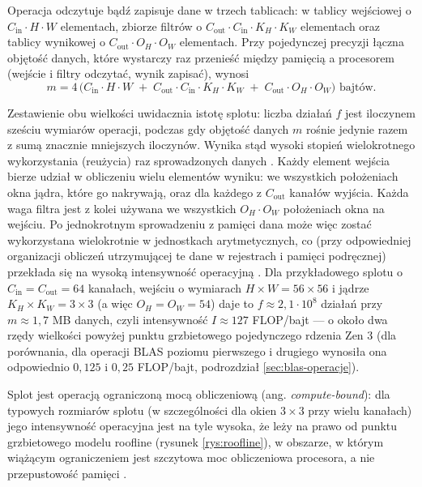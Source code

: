 \documentclass[a4paper,12pt]{book} %
\begin{document}
Operacja odczytuje bądź zapisuje dane w trzech tablicach: w tablicy wejściowej o $C_{\mathrm{in}} \cdot H \cdot W$ elementach, zbiorze filtrów o $C_{\mathrm{out}} \cdot C_{\mathrm{in}} \cdot K_H \cdot K_W$ elementach oraz tablicy wynikowej o $C_{\mathrm{out}} \cdot O_H \cdot O_W$ elementach. Przy pojedynczej precyzji łączna objętość danych, które wystarczy raz przenieść między pamięcią a procesorem (wejście i filtry odczytać, wynik zapisać), wynosi
\[
  m = 4\,\bigl( C_{\mathrm{in}} \cdot H \cdot W \;+\; C_{\mathrm{out}} \cdot C_{\mathrm{in}} \cdot K_H \cdot K_W \;+\; C_{\mathrm{out}} \cdot O_H \cdot O_W \bigr) \text{ bajtów}.
\]

Zestawienie obu wielkości uwidacznia istotę splotu: liczba działań $f$ jest iloczynem sześciu wymiarów operacji, podczas gdy objętość danych $m$ rośnie jedynie razem z sumą znacznie mniejszych iloczynów. Wynika stąd wysoki stopień wielokrotnego wykorzystania (reużycia) raz sprowadzonych danych \cite{goto2008anatomy}. Każdy element wejścia bierze udział w obliczeniu wielu elementów wyniku: we wszystkich położeniach okna jądra, które go nakrywają, oraz dla każdego z $C_{\mathrm{out}}$ kanałów wyjścia. Każda waga filtra jest z kolei używana we wszystkich $O_H \cdot O_W$ położeniach okna na wejściu. Po jednokrotnym sprowadzeniu z pamięci dana może więc zostać wykorzystana wielokrotnie w jednostkach arytmetycznych, co (przy odpowiedniej organizacji obliczeń utrzymującej te dane w rejestrach i pamięci podręcznej) przekłada się na wysoką intensywność operacyjną \cite{georganas2018conv,williams2009roofline}. Dla przykładowego splotu o $C_{\mathrm{in}} = C_{\mathrm{out}} = 64$ kanałach, wejściu o wymiarach $H \times W = 56 \times 56$ i jądrze $K_H \times K_W = 3 \times 3$ (a więc $O_H = O_W = 54$) daje to $f \approx 2{,}1 \cdot 10^{8}$ działań przy $m \approx 1{,}7$ MB danych, czyli intensywność $I \approx 127$ FLOP/bajt --- o około dwa rzędy wielkości powyżej punktu grzbietowego pojedynczego rdzenia Zen 3 (dla porównania, dla operacji BLAS poziomu pierwszego i drugiego wynosiła ona odpowiednio $0{,}125$ i $0{,}25$ FLOP/bajt, podrozdział \ref{sec:blas-operacje}).

Splot jest operacją ograniczoną mocą obliczeniową (ang. \emph{compute-bound}): dla typowych rozmiarów splotu (w szczególności dla okien $3 \times 3$ przy wielu kanałach) jego intensywność operacyjna jest na tyle wysoka, że leży na prawo od punktu grzbietowego modelu roofline (rysunek \ref{rys:roofline}), w obszarze, w którym wiążącym ograniczeniem jest szczytowa moc obliczeniowa procesora, a nie przepustowość pamięci \cite{georganas2018conv}.
\end{document}
